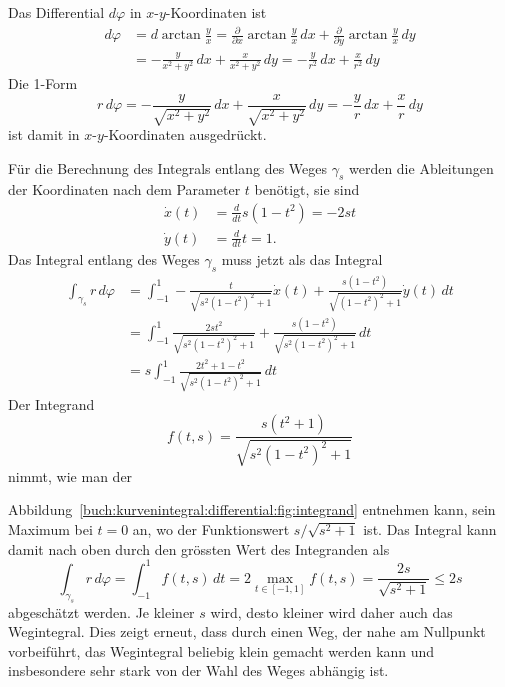 \begin{beispiel}
Das Differential $d\varphi$ in $x$-$y$-Koordinaten ist
\begin{align*}
d\varphi
&=
d\arctan\frac{y}{x}
=
\frac{\partial}{\partial x}\arctan\frac{y}{x}\,dx
+
\frac{\partial}{\partial y}\arctan\frac{y}{x}\,dy
\\
&=
-\frac{y}{x^2+y^2}\,dx
+
\frac{x}{x^2+y^2}\,dy
=
-\frac{y}{r^2}\,dx
+
\frac{x}{r^2}\,dy
\end{align*}
Die 1-Form
\[
r\,d\varphi
=
-\frac{y}{\sqrt{x^2+y^2}}\,dx
+
\frac{x}{\sqrt{x^2+y^2}}\,dy
=
-\frac{y}{r}\,dx
+
\frac{x}{r}\,dy
\]
ist damit in $x$-$y$-Koordinaten ausgedrückt.

Für die Berechnung des Integrals entlang des Weges $\gamma_s$ werden
die Ableitungen der Koordinaten nach dem Parameter $t$ benötigt, sie
sind
\begin{align*}
\dot{x}(t) &= \frac{d}{dt} s(1-t^2) = -2st \\
\dot{y}(t) &= \frac{d}{dt} t = 1.
\end{align*}
Das Integral entlang des Weges $\gamma_s$ muss jetzt als das Integral
\begin{align*}
\int_{\gamma_s} r\,d\varphi
&=
\int_{-1}^1
-\frac{t}{\sqrt{s^2(1-t^2)^2+1}} \dot{x}(t)
+\frac{s(1-t^2)}{\sqrt{(1-t^2)^2+1}} \dot{y}(t)
\,dt
\\
&=
\int_{-1}^1
\frac{2st^2}{\sqrt{s^2(1-t^2)^2+1}} 
+\frac{s(1-t^2)}{\sqrt{s^2(1-t^2)^2+1}}
\,dt
\\
&=
s\int_{-1}^1
\frac{2t^2+1-t^2}{\sqrt{s^2(1-t^2)^2+1}}
\,dt
\end{align*}
Der Integrand
\[
f(t,s)
=
\frac{s(t^2+1)}{\sqrt{s^2(1-t^2)^2+1}}
\]
nimmt, wie man der

Abbildung~\ref{buch:kurvenintegral:differential:fig:integrand}
entnehmen kann, sein Maximum bei $t=0$ an, wo der Funktionswert
$s/\sqrt{s^2+1}$ ist.
Das Integral kann damit nach oben durch den grössten
Wert des Integranden als
\[
\int_{\gamma_s} r\,d\varphi
=
\int_{-1}^1 f(t,s)\,dt
=
2 \max_{t\in[-1,1]} f(t,s)
=
\frac{2s}{\sqrt{s^2+1}}
\le
2s
\]
abgeschätzt werden.
Je kleiner $s$ wird, desto kleiner wird daher auch das Wegintegral.
Dies zeigt erneut, dass durch einen Weg, der nahe am Nullpunkt vorbeiführt,
das Wegintegral beliebig klein gemacht werden kann und insbesondere
sehr stark von der Wahl des Weges abhängig ist.
\end{beispiel}

%
%
